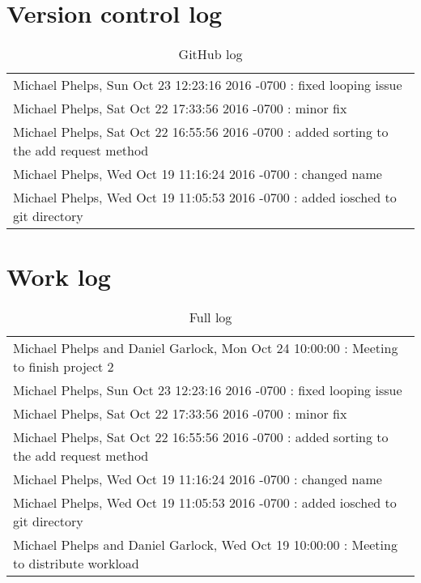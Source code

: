 \documentclass[letterpaper,10pt,titlepage,onecolumn,draftclsnofoot]{IEEETran}
\begin{document}
\newpage
\section{Version control log}
\begin{table}[H]
  \small
\caption{GitHub log}

\begin{tabular}{l}
\hline
Michael Phelps, Sun Oct 23 12:23:16 2016 -0700 : fixed looping issue\\
Michael Phelps, Sat Oct 22 17:33:56 2016 -0700 : minor fix\\
Michael Phelps, Sat Oct 22 16:55:56 2016 -0700 : added sorting to the add request method\\
Michael Phelps, Wed Oct 19 11:16:24 2016 -0700 : changed name\\
Michael Phelps, Wed Oct 19 11:05:53 2016 -0700 : added iosched to git directory\\
\hline
\end{tabular}
\end{table}

\section{Work log}

\begin{table}[H]
  \small
\caption{Full log}

\begin{tabular}{l}
\hline
Michael Phelps and Daniel Garlock, Mon Oct 24 10:00:00 : Meeting to finish project 2\\
Michael Phelps, Sun Oct 23 12:23:16 2016 -0700 : fixed looping issue\\
Michael Phelps, Sat Oct 22 17:33:56 2016 -0700 : minor fix\\
Michael Phelps, Sat Oct 22 16:55:56 2016 -0700 : added sorting to the add request method\\
Michael Phelps, Wed Oct 19 11:16:24 2016 -0700 : changed name\\
Michael Phelps, Wed Oct 19 11:05:53 2016 -0700 : added iosched to git directory\\
Michael Phelps and Daniel Garlock, Wed Oct 19 10:00:00 : Meeting to distribute workload\\

\hline
\end{tabular}
\end{table}
\end{document}

